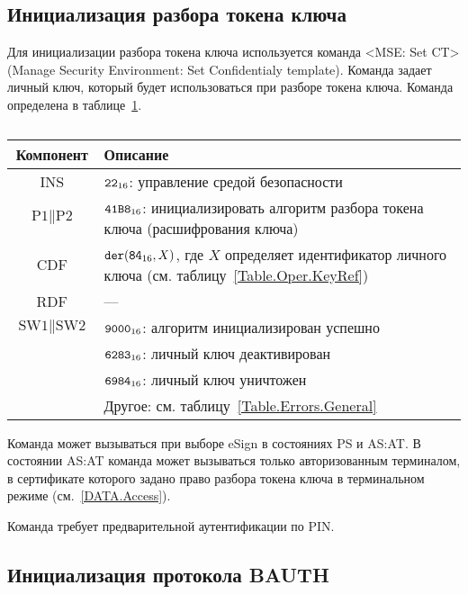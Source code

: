 \subsection{Инициализация разбора токена ключа}
\label{Oper.Descr.SetCT}

Для инициализации разбора токена ключа
используется команда <MSE: Set CT> 
(Manage Security Environment: Set Confidentialy template).
%
Команда задает личный ключ, который будет использоваться при разборе токена 
ключа. Команда определена в таблице~\ref{Table.Oper.SetCTCmd}.

\begin{table}[hbt]
\caption{}\label{Table.Oper.SetCTCmd}
\begin{tabular}{|c|p{14cm}|}
\hline
Компонент & Описание \\
\hline
\hline
INS & $\texttt{22}_{16}$: управление средой безопасности\\ 
\hline
$\text{P1} \parallel\text{P2}$ & $\texttt{41B8}_{16}$: 
инициализировать алгоритм разбора токена ключа
(расшифрования ключа) \\
\hline
CDF & 
$\texttt{der}(\texttt{84}_{16}, X)$, 
где $X$ определяет идентификатор личного ключа
(см. таблицу~\ref{Table.Oper.KeyRef})\\
\hline
\hline
RDF &  --- \\
\hline
$\text{SW1} \parallel \text{SW2}$ & 
$\texttt{9000}_{16}$: алгоритм инициализирован успешно \\
\cline{2-2}
  & $\texttt{6283}_{16}$: личный ключ деактивирован \\
\cline{2-2}
  & $\texttt{6984}_{16}$: личный ключ уничтожен \\
\cline{2-2}
  & Другое: см. таблицу~\ref{Table.Errors.General} \\
\hline
\end{tabular}
\end{table}

Команда может вызываться при выборе eSign в состояниях PS и AS:AT. В состоянии 
AS:AT команда может вызываться только авторизованным терминалом, в сертификате 
которого задано право разбора токена ключа в терминальном режиме 
(см.~\ref{DATA.Access}). 

Команда требует предварительной аутентификации по PIN. 

\subsection{Инициализация протокола BAUTH}
\label{Oper.Descr.SetBAUTH}

